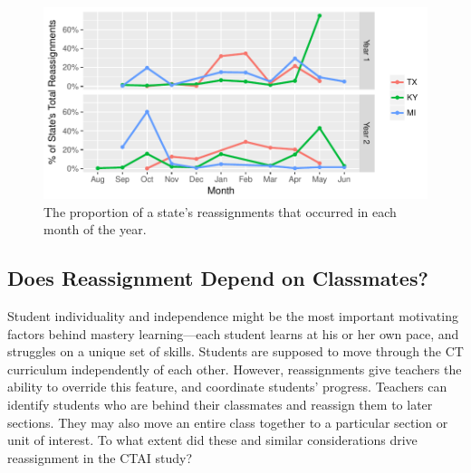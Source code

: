 \documentclass[12pt]{article}\usepackage[]{graphicx}\usepackage[]{color}
\makeatletter
\def\maxwidth{ %
  \ifdim\Gin@nat@width>\linewidth
    \linewidth
  \else
    \Gin@nat@width
  \fi
}
\makeatother
\begin{document}
\begin{figure}
  \centering

\includegraphics[width=\maxwidth]{figure/byMonthState-1} 

\caption{The proportion of a state's reassignments that occurred in
  each month of the year.}
\label{fig:byMonthState}
\end{figure}

\subsection{Does Reassignment Depend on Classmates?}

Student individuality and independence might be the most important
motivating factors behind mastery learning---each student learns at
his or her own pace, and struggles on a unique set of skills.
Students are supposed to move through the CT curriculum independently
of each other.
However, reassignments give teachers the ability to override this
feature, and coordinate students' progress.
Teachers can identify students who are behind their classmates and
reassign them to later sections.
They may also move an entire class together to a particular section or
unit of interest.
To what extent did these and similar considerations drive reassignment
in the CTAI study?
\end{document}
